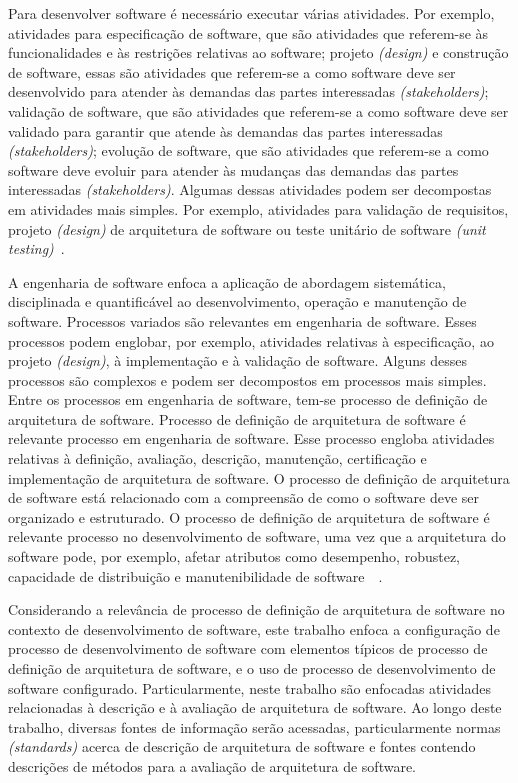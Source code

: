 Para desenvolver software é necessário executar várias atividades. Por exemplo, atividades para especificação de software, que são atividades que referem-se às funcionalidades e às restrições relativas ao software; projeto \emph{(design)} e construção de software, essas são atividades que referem-se a como software deve ser desenvolvido para atender às demandas das partes interessadas \emph{(stakeholders)}; validação de software, que são atividades que referem-se a como software deve ser validado para garantir que atende às demandas das partes interessadas \emph{(stakeholders)}; evolução de software, que são atividades que referem-se a como software deve evoluir para atender às mudanças das demandas das partes interessadas \emph{ (stakeholders)}. Algumas dessas atividades podem ser decompostas em atividades mais simples. Por exemplo, atividades para validação de requisitos,  projeto \emph{(design)} de arquitetura de software ou teste unitário de software \emph{(unit testing)}~\cite{Sommerville_2011_texbook}.

A engenharia de software enfoca a aplicação de abordagem sistemática, disciplinada e quantificável ao desenvolvimento, operação e manutenção de software. Processos variados são relevantes em engenharia de software. Esses processos podem englobar, por exemplo, atividades relativas à especificação, ao projeto \emph{(design)}, à implementação e à validação de software. Alguns desses processos são complexos e podem ser decompostos em processos mais simples. Entre os processos em engenharia de software, tem-se processo de definição de arquitetura de software. Processo de definição de arquitetura de software é relevante processo em engenharia de software. Esse processo engloba atividades relativas à definição, avaliação, descrição, manutenção, certificação e implementação de arquitetura de software. O processo de definição de arquitetura de software está relacionado com a compreensão de como o software deve ser organizado e estruturado. O processo de definição de arquitetura de software é relevante processo no desenvolvimento de software, uma vez que a arquitetura do software pode, por exemplo, afetar atributos como desempenho, robustez, capacidade de distribuição e manutenibilidade de software~\cite{Sommerville_2011_texbook}~\cite{Swebok}. 

Considerando a relevância de processo de definição de arquitetura de software no contexto de desenvolvimento de software, este trabalho enfoca a configuração de processo de desenvolvimento de software com elementos típicos de processo de definição de arquitetura de software, e o uso de processo de desenvolvimento de software configurado. Particularmente, neste trabalho são enfocadas atividades relacionadas à descrição e à avaliação de arquitetura de software. Ao longo deste trabalho, diversas fontes de informação serão acessadas, particularmente normas \emph{(standards)}  acerca de descrição de arquitetura de software e fontes contendo descrições de métodos para a avaliação de arquitetura de software.

